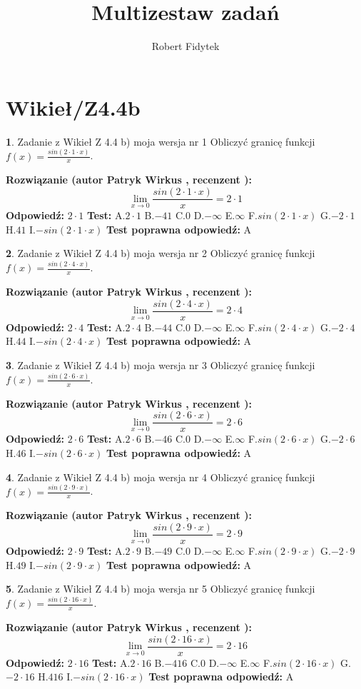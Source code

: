 \documentclass[12pt, a4paper]{article}
\title{Multizestaw zadań}
\author{Robert Fidytek}
\date{}
\theoremstyle{definition} %
\newtheorem{zad}{}
\newcommand{\kategoria}[1]{\section{#1}}
\newcommand{\zadStart}[1]{\begin{zad}#1\newline}
\newcommand{\zadStop}{\end{zad}}
\newcommand{\rozwStart}[2]{\noindent \textbf{Rozwiązanie (autor #1 , recenzent #2): }\newline}
\newcommand{\rozwStop}{\newline}
\newcommand{\odpStart}{\noindent \textbf{Odpowiedź:}\newline}
\newcommand{\odpStop}{\newline}
\newcommand{\testStart}{\noindent \textbf{Test:}\newline}
\newcommand{\testStop}{\newline}
\newcommand{\kluczStart}{\noindent \textbf{Test poprawna odpowiedź:}\newline}
\newcommand{\kluczStop}{\newline}
\begin{document}
\maketitle

\kategoria{Wikieł/Z4.4b}


\zadStart{Zadanie z Wikieł Z 4.4 b) moja wersja nr 1}
Obliczyć granicę funkcji $f(x)=\frac{sin(2 \cdot1\cdot x)}{x}$.
\zadStop
\rozwStart{Patryk Wirkus}{}
$$\lim\limits_{x\to 0}\frac{sin(2 \cdot 1\cdot x)}{x}=
2 \cdot 1$$
\rozwStop
\odpStart
$2 \cdot 1$
\odpStop
\testStart
A.$2 \cdot 1$
B.$-41$
C.$0$
D.$-\infty$
E.$\infty$
F.$sin(2 \cdot 1\cdot x)$
G.$-2 \cdot 1$
H.$41$
I.$-sin(2 \cdot 1\cdot x)$
\testStop
\kluczStart
A
\kluczStop



\zadStart{Zadanie z Wikieł Z 4.4 b) moja wersja nr 2}
Obliczyć granicę funkcji $f(x)=\frac{sin(2 \cdot4\cdot x)}{x}$.
\zadStop
\rozwStart{Patryk Wirkus}{}
$$\lim\limits_{x\to 0}\frac{sin(2 \cdot 4\cdot x)}{x}=
2 \cdot 4$$
\rozwStop
\odpStart
$2 \cdot 4$
\odpStop
\testStart
A.$2 \cdot 4$
B.$-44$
C.$0$
D.$-\infty$
E.$\infty$
F.$sin(2 \cdot 4\cdot x)$
G.$-2 \cdot 4$
H.$44$
I.$-sin(2 \cdot 4\cdot x)$
\testStop
\kluczStart
A
\kluczStop



\zadStart{Zadanie z Wikieł Z 4.4 b) moja wersja nr 3}
Obliczyć granicę funkcji $f(x)=\frac{sin(2 \cdot6\cdot x)}{x}$.
\zadStop
\rozwStart{Patryk Wirkus}{}
$$\lim\limits_{x\to 0}\frac{sin(2 \cdot 6\cdot x)}{x}=
2 \cdot 6$$
\rozwStop
\odpStart
$2 \cdot 6$
\odpStop
\testStart
A.$2 \cdot 6$
B.$-46$
C.$0$
D.$-\infty$
E.$\infty$
F.$sin(2 \cdot 6\cdot x)$
G.$-2 \cdot 6$
H.$46$
I.$-sin(2 \cdot 6\cdot x)$
\testStop
\kluczStart
A
\kluczStop



\zadStart{Zadanie z Wikieł Z 4.4 b) moja wersja nr 4}
Obliczyć granicę funkcji $f(x)=\frac{sin(2 \cdot9\cdot x)}{x}$.
\zadStop
\rozwStart{Patryk Wirkus}{}
$$\lim\limits_{x\to 0}\frac{sin(2 \cdot 9\cdot x)}{x}=
2 \cdot 9$$
\rozwStop
\odpStart
$2 \cdot 9$
\odpStop
\testStart
A.$2 \cdot 9$
B.$-49$
C.$0$
D.$-\infty$
E.$\infty$
F.$sin(2 \cdot 9\cdot x)$
G.$-2 \cdot 9$
H.$49$
I.$-sin(2 \cdot 9\cdot x)$
\testStop
\kluczStart
A
\kluczStop



\zadStart{Zadanie z Wikieł Z 4.4 b) moja wersja nr 5}
Obliczyć granicę funkcji $f(x)=\frac{sin(2 \cdot16\cdot x)}{x}$.
\zadStop
\rozwStart{Patryk Wirkus}{}
$$\lim\limits_{x\to 0}\frac{sin(2 \cdot 16\cdot x)}{x}=
2 \cdot 16$$
\rozwStop
\odpStart
$2 \cdot 16$
\odpStop
\testStart
A.$2 \cdot 16$
B.$-416$
C.$0$
D.$-\infty$
E.$\infty$
F.$sin(2 \cdot 16\cdot x)$
G.$-2 \cdot 16$
H.$416$
I.$-sin(2 \cdot 16\cdot x)$
\testStop
\kluczStart
A
\kluczStop
\end{document}
